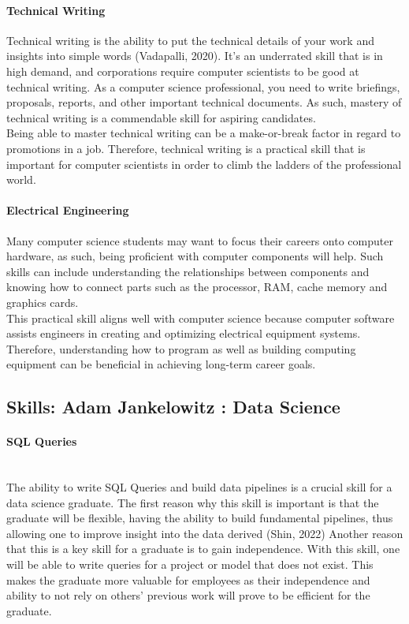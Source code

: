 \documentclass[a4paper, 11pt]{report}
\begin{document}
	\paragraph{Technical Writing} Technical writing is the ability to put the technical details of your work and insights into simple words (Vadapalli, 2020).  It’s an underrated skill that is in high demand, and corporations require computer scientists to be good at technical writing. As a computer science professional, you need to write briefings, proposals, reports, and other important technical documents. As such, mastery of technical writing is a commendable skill for aspiring candidates. 
	\\ Being able to master technical writing can be a make-or-break factor in regard to promotions in a job. Therefore, technical writing is a practical skill that is important for computer scientists in order to climb the ladders of the professional world. 
	
	\paragraph{Electrical Engineering} Many computer science students may want to focus their careers onto computer hardware, as such, being proficient with computer components will help. Such skills can include understanding the relationships between components and knowing how to connect parts such as the processor, RAM, cache memory and graphics cards. 
	\\ This practical skill aligns well with computer science because computer software assists engineers in creating and optimizing electrical equipment systems. Therefore, understanding how to program as well as building computing equipment can be beneficial in achieving long-term career goals.
	
	
	
	\subsection{Skills: Adam Jankelowitz : Data Science}
	
	\paragraph{SQL Queries}
	\\The ability to write SQL Queries and build data pipelines is a crucial skill for a data science graduate. The first reason why this skill is important is that the graduate will be flexible, having the ability to build fundamental pipelines, thus allowing one to improve insight into the data derived (Shin, 2022) Another reason that this is a key skill for a graduate is to gain independence. With this skill, one will be able to write queries for a project or model that does not exist. This makes the graduate more valuable for employees as their independence and ability to not rely on others’ previous work will prove to be efficient for the graduate.
	
\end{document}
